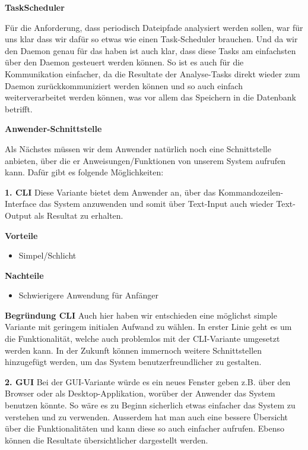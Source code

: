 \documentclass[a4paper,12pt]{report}
\begin{document}
        {\large\bfseries TaskScheduler}

    Für die Anforderung, dass periodisch Dateipfade analysiert werden sollen, war für uns klar dass wir dafür so etwas wie einen
    Task-Scheduler brauchen.
    Und da wir den Daemon genau für das haben ist auch klar, dass diese Tasks am einfachsten über den Daemon gesteuert werden können.
    So ist es auch für die Kommunikation einfacher, da die Resultate der Analyse-Tasks direkt wieder zum Daemon zurückkommuniziert werden können
    und so auch einfach weiterverarbeitet werden können, was vor allem das Speichern in die Datenbank betrifft.

        {\large\bfseries Anwender-Schnittstelle}

    Als Nächstes müssen wir dem Anwender natürlich noch eine Schnittstelle anbieten, über die er Anweisungen/Funktionen von unserem System
    aufrufen kann.
    Dafür gibt es folgende Möglichkeiten:

    \textbf{1. CLI}
    Diese Variante bietet dem Anwender an, über das Kommandozeilen-Interface das System anzuwenden und somit über
    Text-Input auch wieder Text-Output als Resultat zu erhalten.

    \textbf{Vorteile}
    \begin{itemize}
        \item Simpel/Schlicht
    \end{itemize}

    \textbf{Nachteile}
    \begin{itemize}
        \item Schwierigere Anwendung für Anfänger
    \end{itemize}

    \textbf{Begründung CLI} Auch hier haben wir entschieden eine möglichst simple Variante mit geringem initialen Aufwand zu wählen.
    In erster Linie geht es um die Funktionalität, welche auch problemlos mit der CLI-Variante umgesetzt werden kann.
    In der Zukunft können immernoch weitere Schnittstellen hinzugefügt werden, um das System benutzerfreundlicher zu gestalten.

    \textbf{2. GUI}
    Bei der GUI-Variante würde es ein neues Fenster geben z.B. über den Browser oder als Desktop-Applikation,
    worüber der Anwender das System benutzen könnte.
    So wäre es zu Beginn sicherlich etwas einfacher das System zu verstehen und zu verwenden.
    Ausserdem hat man auch eine bessere Übersicht über die Funktionalitäten und kann diese so auch einfacher aufrufen.
    Ebenso können die Resultate übersichtlicher dargestellt werden.
\end{document}
